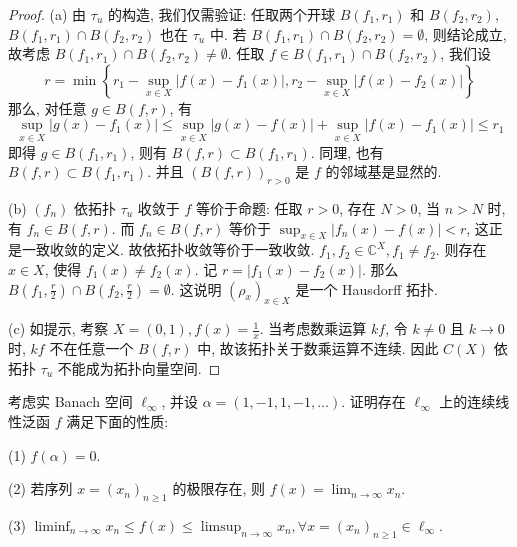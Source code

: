 \documentclass{mathexercise}
\begin{document}
\begin{proof}
    (a) 由 $\tau_{u}$ 的构造, 我们仅需验证: 任取两个开球 $B\left(f_{1}, r_{1}\right)$ 和 $B\left(f_{2}, r_{2}\right)$,
    $B(f_{1}, r_1)\cap B(f_{2},r_{2})$ 也在 $\tau_{u}$ 中. 
    若 $B\left(f_{1}, r_{1}\right) \cap B\left(f_{2}, r_{2}\right)=\emptyset$, 则结论成立, 
    故考虑 $B\left(f_{1}, r_{1}\right) \cap B\left(f_{2}, r_{2}\right) \neq\emptyset$. 
    任取 $f \in B\left(f_{1}, r_{1}\right) \cap B\left(f_{2}, r_{2}\right)$, 我们设
    \[
    r=\min \left\{r_{1}-\sup _{x \in X}\left|f(x)-f_{1}(x)\right|, r_{2}-\sup _{x \in X}\left|f(x)-f_{2}(x)\right|\right\}
    \]
    那么, 对任意 $g\in B(f, r)$, 有
    \[
    \sup _{x \in X}\left|g(x)-f_{1}(x)\right| \leq \sup _{x \in X}|g(x)-f(x)|+\sup _{x \in X}\left|f(x)-f_{1}(x)\right| \leq r_{1}
    \]
    即得 $g \in B\left(f_{1}, r_{1}\right)$, 则有 $B(f, r) \subset B\left(f_{1}, r_{1}\right)$. 
    同理, 也有 $B(f, r) \subset B\left(f_{1}, r_{1}\right)$. 并且 $(B(f, r))_{r>0}$ 是 $f$ 的邻域基是显然的.

    (b) $\left(f_{n}\right)$ 依拓扑 $\tau_{u}$ 收敛于 $f$ 等价于命题: 
    任取 $r>0$, 存在 $N>0$, 当 $n>N$ 时, 有 $f_{n} \in B(f,r)$. 
    而 $f_{n}\in B(f, r)$ 等价于 $\sup_{x \in X}\left|f_{n}(x)-f(x)\right|<r$, 这正是一致收敛的定义. 故依拓扑收敛等价于一致收敛.
    $f_1,f_2\in\mathbb{C}^{X}, f_1\neq f_2$. 则存在 $x \in X$, 
    使得 $f_1(x)\neq f_2(x)$. 记 $r=\left|f_{1}(x)-f_{2}(x)\right|$. 
    那么 $B\left(f_{1}, \frac{r}{2}\right) \cap B\left(f_{2}, \frac{r}{2}\right)=\emptyset$. 
    这说明 $\left(\rho_{x}\right)_{x \in X}$ 是一个 Hausdorff 拓扑.

    (c) 如提示, 考察 $X=(0,1), f(x)=\frac{1}{x}$. 当考虑数乘运算 $kf$, 
    令 $k\neq 0$ 且 $k \rightarrow 0$ 时, $kf$ 不在任意一个 $B(f, r)$ 中, 
    故该拓扑关于数乘运算不连续. 因此 $C(X)$ 依拓扑 $\tau_{u}$ 不能成为拓扑向量空间.
\end{proof}



\begin{exercise}
    考虑实 Banach 空间 $\ell_{\infty}$, 并设 $\alpha=(1,-1,1,-1,\ldots)$. 
    证明存在 $\ell_{\infty}$ 上的连续线性泛函 $f$ 满足下面的性质:

    (1) $f(\alpha)=0$.

    (2) 若序列 $x=(x_n)_{n\geq 1}$ 的极限存在, 则 $f(x)=\lim_{n\to\infty}x_n$.

    (3) $\liminf_{n\to\infty} x_n\leq f(x)\leq\limsup_{n\to\infty} x_n, \forall x=(x_n)_{n\geq 1}\in\ell_{\infty}$.
\end{exercise}
\end{document}
